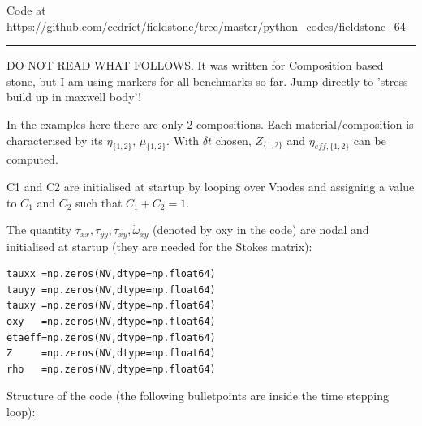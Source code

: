 

\begin{center}
Code at \url{https://github.com/cedrict/fieldstone/tree/master/python_codes/fieldstone_64}
\end{center}

\par\noindent\rule{\textwidth}{0.4pt}


{\large
DO NOT READ WHAT FOLLOWS. It was written for Composition based stone, but I am using 
markers for all benchmarks so far. Jump directly to 'stress build up in maxwell body'! 
}

In the examples here there are only 2 compositions. 
Each material/composition is characterised by its $\eta_{\{1,2\}}$, $\mu_{\{1,2\}}$. 
With $\delta t$ chosen, $Z_{\{1,2\}}$ and $\eta_{eff,\{1,2\}}$ can be computed.

C1 and C2 are initialised at startup by looping over Vnodes and assigning a value to $C_1$ 
and $C_2$ such that $C_1+C_2=1$. 

The quantity $\tau_{xx},\tau_{yy},\tau_{xy},\dot{\omega}_{xy}$ (denoted by oxy in the code) 
are nodal and initialised at startup
(they are needed for the Stokes matrix):
\begin{lstlisting}
tauxx =np.zeros(NV,dtype=np.float64)  
tauyy =np.zeros(NV,dtype=np.float64)  
tauxy =np.zeros(NV,dtype=np.float64)  
oxy   =np.zeros(NV,dtype=np.float64)  
etaeff=np.zeros(NV,dtype=np.float64)  
Z     =np.zeros(NV,dtype=np.float64)  
rho   =np.zeros(NV,dtype=np.float64)  
\end{lstlisting}

Structure of the code (the following bulletpoints are inside the time stepping loop):

